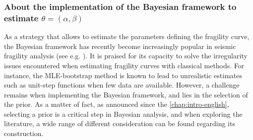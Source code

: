  




\subsubsection{About the implementation of the Bayesian framework to estimate $\theta=(\alpha,\beta)$}

As a strategy that allows to estimate the parameters defining the fragility curve, 
the Bayesian framework has recently become increasingly popular in seismic fragility analysis (see e.g. \cite{gardoni_probabilistic_2002,wang_bayesian_2018,katayama_bayesian-estimation-based_2021,koutsourelakis_assessing_2010,damblin_approche_2014,tadinada_structural_2017,kwag_computationally_2018,jeon_parameterized_2019,tabandeh_physics-based_2020}). 
It is praised for its capacity to solve the irregularity issues encountered when estimating fragility curves with classical methods. For instance, the MLE-bootstrap method is known to lead to unrealistic estimates such as unit-step functions when few data are available.
However, a challenge remains when %
implementing the Bayesian framework, and 
lies in the selection of the prior.
As a matter of fact, as announced since the \cref{chap:intro-english}, selecting a prior is a critical step in Bayesian analysis, %
and when exploring the literature, a wide range of different consideration can be found regarding its construction. %
%

